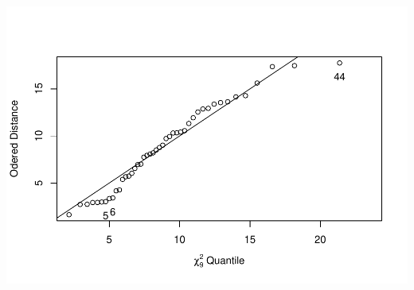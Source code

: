 \documentclass[
]{article}
\begin{document}
\includegraphics[width=0.5\linewidth,height=0.5\textheight]{hudm6122_hw_01_ChenguangPan_files/figure-latex/unnamed-chunk-4-1}
\end{document}
